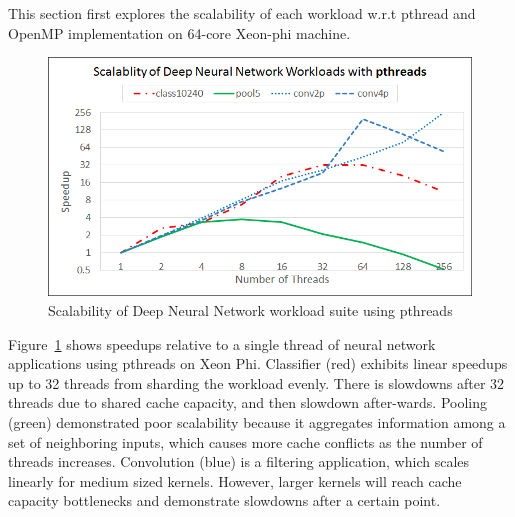 This section first explores  the scalability of each workload
w.r.t pthread and OpenMP implementation on 64-core Xeon-phi machine. 

\begin{figure}
  \begin{center}
    \includegraphics[width=\linewidth]{cs758-figs/scalability-dnn-pthread.png}
  \end{center}
\vspace{-0.2in}
  \caption{Scalability of Deep Neural Network workload suite using pthreads}
  \label{fig:scalability-dnn-pthread}
\vspace{-0.05in}
\end{figure}

Figure~\ref{fig:scalability-dnn-pthread} shows speedups relative to a single 
thread of neural network applications using pthreads on Xeon Phi. 
Classifier (red) exhibits linear speedups up to 32 threads from sharding the 
workload evenly. There is slowdowns after 32 threads due to  shared cache 
capacity, and then slowdown after-wards. Pooling (green) demonstrated poor 
scalability because it aggregates information among a set of neighboring 
inputs, which causes more cache conflicts as the number of threads increases. 
Convolution (blue) is a filtering application, which scales linearly for medium 
sized kernels. However, larger kernels will reach cache capacity bottlenecks and 
demonstrate slowdowns after a certain point. 

